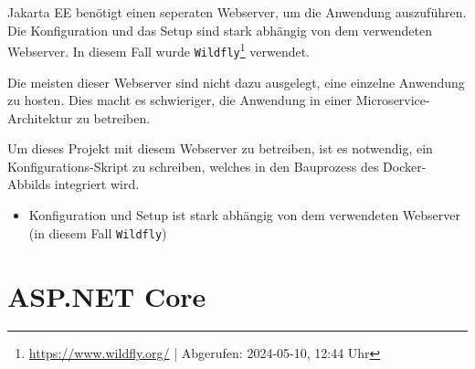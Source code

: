 Jakarta EE benötigt einen seperaten Webserver, um die Anwendung auszuführen. 
Die Konfiguration und das Setup sind stark abhängig von dem verwendeten Webserver. 
In diesem Fall wurde \texttt{Wildfly}\footnote{\url{https://www.wildfly.org/} | Abgerufen: 2024-05-10, 12:44 Uhr} verwendet.

Die meisten dieser Webserver sind nicht dazu ausgelegt, eine einzelne Anwendung zu hosten.
Dies macht es schwieriger, die Anwendung in einer Microservice-Architektur zu betreiben.

Um dieses Projekt mit diesem Webserver zu betreiben, ist es notwendig, ein Konfigurations-Skript zu schreiben, welches in den Bauprozess des Docker-Abbilds integriert wird.

\begin{itemize}
    \item Konfiguration und Setup ist stark abhängig von dem verwendeten Webserver (in diesem Fall \texttt{Wildfly})
\end{itemize}

\section{ASP.NET Core}
